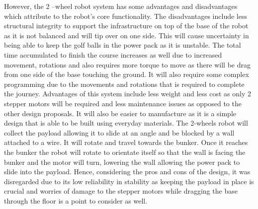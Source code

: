 \documentclass[12pt]{report}
\begin{document}
 However, the 2 –wheel robot system has some advantages and disadvantages which attribute to the robot’s core functionality.  The disadvantages include less structural integrity to support the infrastructure on top of the base of the robot as it is not balanced and will tip over on one side. This will cause uncertainty in being able to keep the golf balls in the power pack as it is unstable. The total time accumulated to finish the course increases as well due to increased movement, rotations and also requires more torque to move as there will be drag from one side of the base touching the ground. It will also require some complex programming due to the movements and rotations that is required to complete the journey. Advantages of this system include less weight and less cost as only 2 stepper motors will be required and less maintenance issues as opposed to the other design proposals. It will also be easier to manufacture as it is a simple design that is able to be built using everyday materials.
The 2-wheels robot will collect the payload allowing it to slide at an angle and be blocked by a wall attached to a wire. It will rotate and travel towards the bunker. Once it reaches the bunker the robot will rotate to orientate itself so that the wall is facing the bunker and the motor will turn, lowering the wall allowing the power pack to slide into the payload.
Hence, considering the pros and cons of the design, it was disregarded due to its low reliability in stability as keeping the payload in place is crucial and worries of damage to the stepper motors while dragging the base through the floor is a point to consider as well.


\end{document}
